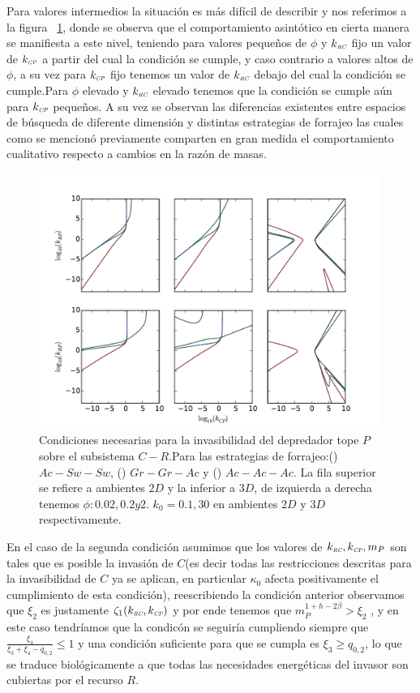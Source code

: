 Para valores intermedios la situaci\'on es m\'as dif\'icil de describir y nos referimos a la figura  ~\ref{fig:NC_PCR}, donde se observa que el comportamiento asint\'otico en cierta manera se manifiesta a este nivel, teniendo para valores peque\~nos de $\phi$ y $k_{\textit{\tiny RC}}$ fijo un valor de $k_{\textit{\tiny CP}}$ a partir del cual la condici\'on se cumple, y caso contrario a valores altos de $\phi$, a su vez para $k_{\textit{\tiny CP}}$ fijo tenemos un valor de $k_{\textit{\tiny RC}}$ debajo del cual la condici\'on se cumple.Para $\phi$ elevado y $k_{\textit{\tiny RC}}$ elevado tenemos que la condici\'on se cumple a\'un para $k_{\textit{\tiny CP}}$ peque\~nos. A su vez se observan las diferencias existentes entre espacios de b\'usqueda de diferente dimensi\'on y distintas estrategias de forrajeo las cuales como se mencion\'o previamente comparten en gran medida el comportamiento cualitativo respecto a cambios en la raz\'on de masas.

\begin{figure}
  \centering
  \includegraphics[width = 0.99\textwidth]{./Plots/NecessityPCR.pdf}
  \caption[Condiciones Necesarias $P \to C-R$]{Condiciones necesarias para la invasibilidad del depredador tope $P$ sobre el subsistema $C-R$.Para las estrategias de forrajeo:({\hwplotR}) $Ac-Sw-Sw$, ({\hwplotG}) $Gr-Gr-Ac$ y ({\hwplotB}) $Ac-Ac-Ac$. La fila superior se refiere a ambientes $2D$ y la inferior a $3D$, de izquierda a derecha tenemos $\phi : 0.02,0.2 y 2$. $k_0= 0.1,30$ en ambientes $2D$ y $3D$ respectivamente.}
  \label{fig:NC_PCR}
\end{figure}

En el caso de la segunda condici\'on asumimos que los valores de $k_{\textit{\tiny RC}} , k_{\textit{\tiny CP}} , m_P$ son tales que es posible la invasi\'on de $C$(es decir todas las restricciones descritas para la invasibilidad de $C$ ya se aplican, en particular $\kappa_0$ afecta positivamente el cumplimiento de esta condici\'on), reescribiendo la condici\'on anterior observamos que $\xi_2$ es justamente $\zeta_1(k_{\textit{\tiny RC}},k_{\textit{\tiny CP}})$ y por ende tenemos que $m_P^{1 + h - 2\beta} > \xi_2$ , y en este caso tendr\'iamos que la condic\'on se seguir\'ia cumpliendo siempre que $\frac{\xi_4}{\xi_3 + \xi_4 - q_{0,2}} \leq 1$ y una condici\'on suficiente para que se cumpla es $ \xi_3 \geq q_{0,2}$, lo que se traduce biol\'ogicamente a que todas las necesidades energ\'eticas del invasor son cubiertas por el recurso $R$.\\

